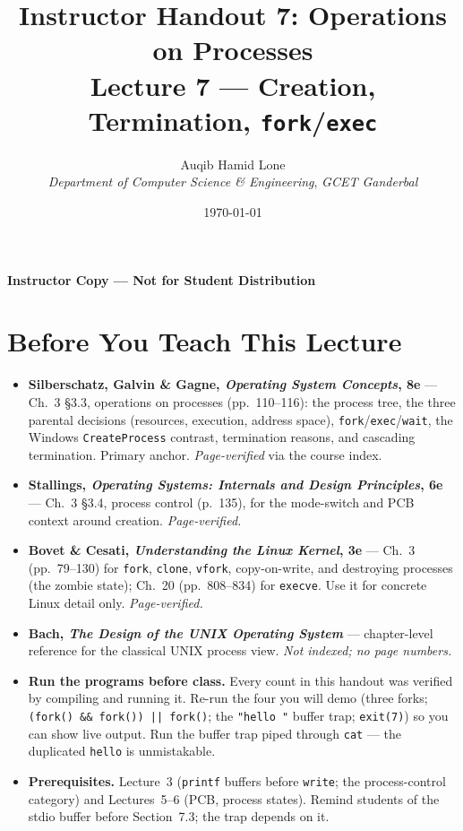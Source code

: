 \documentclass[11pt]{article}
\title{Instructor Handout 7: Operations on Processes\\[0.3em]
  \large Lecture 7 --- Creation, Termination, \texttt{fork}/\texttt{exec}}
\author{Auqib Hamid Lone\\[0.3em]
  \emph{Department of Computer Science \& Engineering}, \emph{GCET Ganderbal}}
\date{\today}
\begin{document}
\maketitle
{\centering\large\color{negative}\textbf{Instructor Copy --- Not for Student Distribution}\par}
\vspace{0.5cm}

\section{Before You Teach This Lecture}

\begin{itemize}
  \item \textbf{Silberschatz, Galvin \& Gagne, \textit{Operating System Concepts}, 8e} --- Ch.~3 \S3.3, operations on processes (pp.~110--116): the process tree, the three parental decisions (resources, execution, address space), \texttt{fork}/\texttt{exec}/\texttt{wait}, the Windows \texttt{CreateProcess} contrast, termination reasons, and cascading termination. Primary anchor. \emph{Page-verified} via the course index.
  \item \textbf{Stallings, \textit{Operating Systems: Internals and Design Principles}, 6e} --- Ch.~3 \S3.4, process control (p.~135), for the mode-switch and PCB context around creation. \emph{Page-verified.}
  \item \textbf{Bovet \& Cesati, \textit{Understanding the Linux Kernel}, 3e} --- Ch.~3 (pp.~79--130) for \texttt{fork}, \texttt{clone}, \texttt{vfork}, copy-on-write, and destroying processes (the zombie state); Ch.~20 (pp.~808--834) for \texttt{execve}. Use it for concrete Linux detail only. \emph{Page-verified.}
  \item \textbf{Bach, \textit{The Design of the UNIX Operating System}} --- chapter-level reference for the classical UNIX process view. \emph{Not indexed; no page numbers.}
  \item \textbf{Run the programs before class.} Every count in this handout was verified by compiling and running it. Re-run the four you will demo (three forks; \texttt{(fork() \&\& fork()) || fork()}; the \texttt{"hello "} buffer trap; \texttt{exit(7)}) so you can show live output. Run the buffer trap piped through \texttt{cat} --- the duplicated \texttt{hello} is unmistakable.
  \item \textbf{Prerequisites.} Lecture~3 (\texttt{printf} buffers before \texttt{write}; the process-control category) and Lectures~5--6 (PCB, process states). Remind students of the stdio buffer before Section~7.3; the trap depends on it.
\end{itemize}
\end{document}
